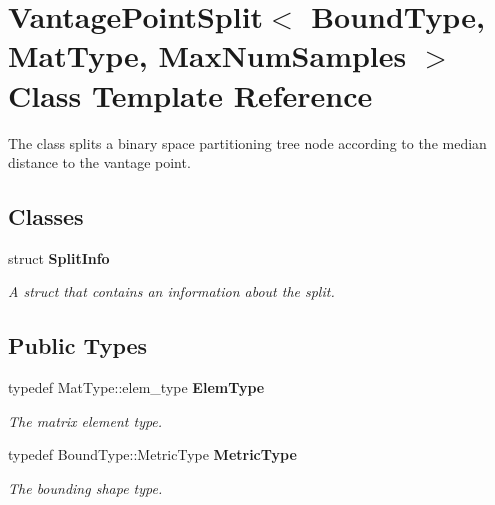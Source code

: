 \section{Vantage\+Point\+Split$<$ Bound\+Type, Mat\+Type, Max\+Num\+Samples $>$ Class Template Reference}
\label{classmlpack_1_1tree_1_1VantagePointSplit}


The class splits a binary space partitioning tree node according to the median distance to the vantage point.  


\subsection*{Classes}
\begin{DoxyCompactItemize}
\item 
struct \textbf{ Split\+Info}
\begin{DoxyCompactList}\small\item\em A struct that contains an information about the split. \end{DoxyCompactList}\end{DoxyCompactItemize}
\subsection*{Public Types}
\begin{DoxyCompactItemize}
\item 
typedef Mat\+Type\+::elem\+\_\+type \textbf{ Elem\+Type}
\begin{DoxyCompactList}\small\item\em The matrix element type. \end{DoxyCompactList}\item 
typedef Bound\+Type\+::\+Metric\+Type \textbf{ Metric\+Type}
\begin{DoxyCompactList}\small\item\em The bounding shape type. \end{DoxyCompactList}\end{DoxyCompactItemize}
